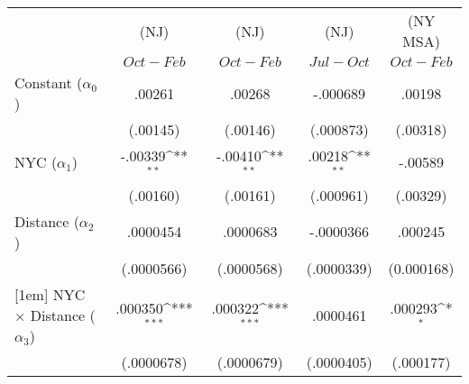 {
\def\sym#1{\ifmmode^{#1}\else\(^{#1}\)\fi}
\begin{tabular}{l*{4}{c}}
\hline\hline
                    &\multicolumn{1}{c}{(NJ)}&\multicolumn{1}{c}{(NJ)}&\multicolumn{1}{c}{(NJ)}&\multicolumn{1}{c}{(NY MSA)}\\
                    &\multicolumn{1}{c}{$Oct-Feb$}&\multicolumn{1}{c}{$Oct-Feb$}&\multicolumn{1}{c}{$Jul-Oct$}&\multicolumn{1}{c}{$Oct-Feb$}\\
\hline
Constant ($ \alpha_0 $)           &     .00261         &     .00268         &   -.000689         &     .00198         \\
                    &   (.00145)         &   (.00146)         &  (.000873)         &   (.00318)        \\
        [1em]
NYC ($ \alpha_1 $)     &    -.00339\sym{**}  &    -.00410\sym{**}  &     .00218\sym{**}  &       -.00589              \\
                    &   (.00160)         &   (.00161)         &  (.000961)         &                     (.00329)   \\
[1em]
Distance   ($\alpha_2$)            &   .0000454         &   .0000683         &  -.0000366         &                      .000245         \\
                    & (.0000566)         & (.0000568)         & (.0000339)         &                     (0.000168)      \\
[1em]
NYC $\times$ Distance ($\alpha_3$)    &    .000350\sym{***}&    .000322\sym{***}&   .0000461         &     .000293\sym{*}                 \\
                    & (.0000678)         & (.0000679)         & (.0000405)         &                     (.000177)   \\

\end{tabular}}
